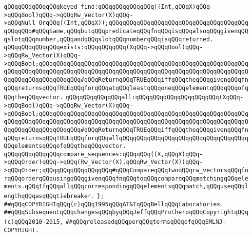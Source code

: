 \verb|qQQqqQQqqQQqqQQqkeyed_find:qQQqqQQqqQQqqQQq((Int,qQQqX)qQQq->qQQqBool)qQQq->qQQqRw_Vector(X)qQQq->qQQqNull_OrqQQq((Int,qQQqX));qQQqqQQqqQQqqQQqqQQqqQQqqQQqqQQqqQQqqQQqqQQqqQQq#qQQqSame,qQQqbutqQQqpredicateqQQqfnqQQqisqQQqalsoqQQqgivenqQQqslotqQQqnumber,qQQqandqQQqslotqQQqnumberqQQqisqQQqreturned.|\newline
\newline
\verb|qQQqqQQqqQQqqQQqexists:qQQqqQQqqQQq(XqQQq->qQQqBool)qQQq->qQQqRw_Vector(X)qQQq->qQQqBool;qQQqqQQqqQQqqQQqqQQqqQQqqQQqqQQqqQQqqQQqqQQqqQQqqQQqqQQqqQQqqQQqqQQqqQQqqQQqqQQqqQQqqQQqqQQqqQQqqQQqqQQqqQQqqQQqqQQqqQQqqQQqqQQqqQQqqQQqqQQqqQQqqQQqqQQq#qQQqReturnqQQqTRUEqQQqiffqQQqtheqQQqgivenqQQqfnqQQqreturnsqQQqTRUEqQQqforqQQqatqQQqleastqQQqoneqQQqelementqQQqqQQqofqQQqtheqQQqvector.|\newline
\verb|qQQqqQQqqQQqqQQqall:qQQqqQQqqQQqqQQqqQQqqQQq(XqQQq->qQQqBool)qQQq->qQQqRw_Vector(X)qQQq->qQQqBool;qQQqqQQqqQQqqQQqqQQqqQQqqQQqqQQqqQQqqQQqqQQqqQQqqQQqqQQqqQQqqQQqqQQqqQQqqQQqqQQqqQQqqQQqqQQqqQQqqQQqqQQqqQQqqQQqqQQqqQQqqQQqqQQqqQQqqQQqqQQqqQQqqQQqqQQq#qQQqReturnqQQqTRUEqQQqiffqQQqtheqQQqgivenqQQqfnqQQqreturnsqQQqTRUEqQQqforqQQqallqQQqqQQqqQQqqQQqqQQqqQQqqQQqqQQqqQQqqQQqelementsqQQqofqQQqtheqQQqvector.|\newline
\newline
\verb|qQQqqQQqqQQqqQQqcompare_sequences:qQQqqQQq((X,qQQqX)qQQq->qQQqOrder)qQQq->qQQq(Rw_Vector(X),qQQqRw_Vector(X))qQQq->qQQqOrder;qQQqqQQqqQQqqQQqqQQq#qQQqCompareqQQqtwoqQQqrw_vectorsqQQqforqQQqorderqQQqusingqQQqgivenqQQqfnqQQqtoqQQqcompareqQQqmatchingqQQqelements.qQQqIfqQQqallqQQqcorrespondingqQQqelementsqQQqmatch,qQQquseqQQqlengthqQQqasqQQqtiebreaker.|\newline
\verb|};|\newline
\newline
\newline
\verb|##qQQqCOPYRIGHTqQQq(c)qQQq1995qQQqAT&TqQQqBellqQQqLaboratories.|\newline
\verb|##qQQqSubsequentqQQqchangesqQQqbyqQQqJeffqQQqProtheroqQQqCopyrightqQQq(c)qQQq2010-2015,|\newline
\verb|##qQQqreleasedqQQqperqQQqtermsqQQqofqQQqSMLNJ-COPYRIGHT.|\newline

